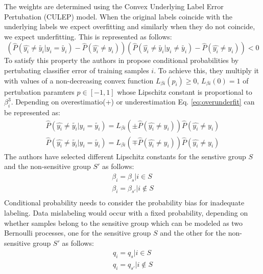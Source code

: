 \documentclass[runningheads]{llncs}
\begin{document}
The weights are determined using the Convex Underlying Label Error Pertubation (CULEP) model. When the original labels coincide with the underlying labels we expect overfitting and similarly when they do not coincide, we expect underfitting. This is represented as follows:
\begin{equation}
(\hat{P}(\hat{y_i} \neq \tilde{y_i} | y_i = \tilde{y_i})-\hat{P}(\hat{y_i} \neq y_i))(\hat{P}(\hat{y_i} \neq \tilde{y_i} | y_i \neq \tilde{y_i})-\hat{P}(\hat{y_i} \neq y_i)) < 0
\label{eq:overunderfit}
\end{equation}
To satisfy this property the authors in \cite{krasanakis2018adaptive} propose conditional probabilities by pertubating classifier error of training samples $i$. To achieve this, they multiply it with values of a non-decreasing convex function $L_{\beta i}(p_i) \geq 0$, $L_{\beta i}(0) = 1$ of pertubation paramters $p \in [-1,1]$ whose Lipschitz constant is proportional to $\beta_i^3$. Depending on overestimatio(+) or underestimation Eq. \ref{eq:overunderfit} can be represented as:
\begin{equation}
\begin{split}
\hat{P}(\hat{y_i} \neq \tilde{y_i} | y_i = \tilde{y_i}) = L_{\beta i}(\pm \hat{P}(\hat{y_i} \neq y_i))\hat{P}(\hat{y_i} \neq y_i) \\
\hat{P}(\hat{y_i} \neq \tilde{y_i} | y_i = \tilde{y_i}) = L_{\beta i}(\mp \hat{P}(\hat{y_i} \neq y_i))\hat{P}(\hat{y_i} \neq y_i) 
\end{split}
\label{eq:lipschitz}
\end{equation}
The authors have selected different Lipschitz constants for the senstive group $S$ and the non-sensitive group $S'$ as follows:
\begin{equation}
\begin{split}
\beta_i = \beta_s | i \in S\\
\beta_i = \beta_{s'} | i \notin S\\
\end{split}
\label{eq:lipschitzconstants}
\end{equation}
Conditional probability needs to consider the probability bias for inadequate labeling. Data mislabeling would occur with a fixed probability, depending on whether samples belong to the sensitive group which can be modeled as two Bernoulli processes, one for the sensitive group $S$ and the other for the non-sensitive group $S'$ as follows:
\begin{equation}
\begin{split}
q_i = q_s | i \in S\\
q_i = q_{s'} | i \notin S\\
\end{split}
\label{eq:bernoulliconstants}
\end{equation}
\end{document}
